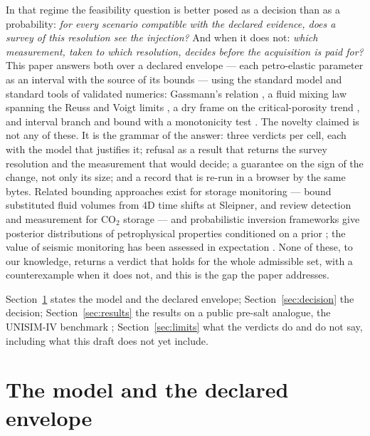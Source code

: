 \documentclass[preprint,11pt,authoryear]{elsarticle}
\begin{document}
In that regime the feasibility question is better posed as a decision than as a probability: \emph{for every scenario compatible with the declared evidence, does a survey of this resolution see the injection?} And when it does not: \emph{which measurement, taken to which resolution, decides before the acquisition is paid for?} This paper answers both over a declared envelope --- each petro-elastic parameter as an interval with the source of its bounds --- using the standard model and standard tools of validated numerics: Gassmann's relation \citep{gassmann1951,mavko2009}, a fluid mixing law spanning the Reuss and Voigt limits \citep{brie1995}, a dry frame on the critical-porosity trend \citep{nur1998}, and interval branch and bound with a monotonicity test \citep{hansen2004,moore2009}. The novelty claimed is not any of these. It is the grammar of the answer: three verdicts per cell, each with the model that justifies it; refusal as a result that returns the survey resolution and the measurement that would decide; a guarantee on the sign of the change, not only its size; and a record that is re-run in a browser by the same bytes. Related bounding approaches exist for storage monitoring --- \citet{bergmann2015} bound substituted fluid volumes from 4D time shifts at Sleipner, and \citet{chadwick2014} review detection and measurement for CO$_2$ storage --- and probabilistic inversion frameworks give posterior distributions of petrophysical properties conditioned on a prior \citep{grana2022,zhang2023}; the value of seismic monitoring has been assessed in expectation \citep{anyosa2021}. None of these, to our knowledge, returns a verdict that holds for the whole admissible set, with a counterexample when it does not, and this is the gap the paper addresses.

Section~\ref{sec:model} states the model and the declared envelope; Section~\ref{sec:decision} the decision; Section~\ref{sec:results} the results on a public pre-salt analogue, the UNISIM-IV benchmark \citep{unisim}; Section~\ref{sec:limits} what the verdicts do and do not say, including what this draft does not yet include.

\section{The model and the declared envelope}\label{sec:model}
\end{document}
